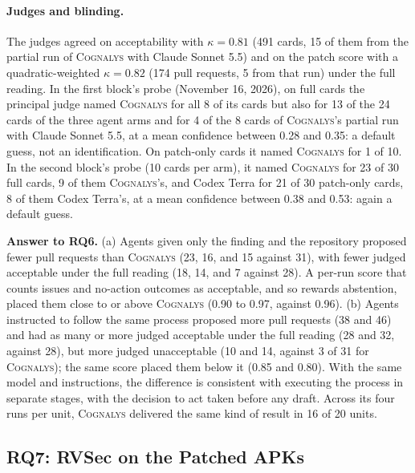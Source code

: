 \documentclass[conference]{IEEEtran}
\newcommand{\system}{\textsc{Cognalys}}
\newcommand{\researchq}[1]{\textbf{RQ#1}}
\begin{document}
\paragraph{Judges and blinding.} The judges agreed on acceptability with
$\kappa = 0.81$ (491 cards, 15 of them from the partial run of \system{} with
Claude Sonnet 5.5) and on the patch score with a quadratic-weighted
$\kappa = 0.82$ (174 pull requests, 5 from that run) under the full reading. In the first block's probe
(November 16, 2026), on full cards the principal judge named \system{} for all
8 of its cards but also for 13 of the 24 cards of the three agent arms and for
4 of the 8 cards of \system{}'s partial run with Claude Sonnet 5.5, at a mean
confidence between 0.28 and 0.35: a default guess, not an identification. On patch-only cards it named
\system{} for 1 of 10. In the second block's probe (10 cards per arm), it named \system{} for 23 of
30 full cards, 9 of them \system{}'s, and Codex Terra for 21 of 30 patch-only
cards, 8 of them Codex Terra's, at a mean confidence between 0.38 and 0.53:
again a default guess.

\textbf{Answer to \researchq{6}.} (a) Agents given only the finding and the
repository proposed fewer pull requests than \system{} (23, 16, and 15 against
31), with fewer judged acceptable under the full reading (18, 14, and 7 against
28). A per-run score that counts issues and no-action outcomes as acceptable,
and so rewards abstention, placed them close to or above \system{} (0.90 to
0.97, against 0.96). (b) Agents instructed to follow the same process proposed
more pull requests (38 and 46) and had as many or more judged acceptable under
the full reading (28 and 32, against 28), but more judged unacceptable (10 and
14, against 3 of 31 for \system{}); the same score placed them below it (0.85
and 0.80). With the same model and instructions, the difference is consistent
with executing the process in separate stages, with the decision to act taken
before any draft. Across its four runs per unit, \system{} delivered the same
kind of result in 16 of 20 units.

\subsection{\researchq{7}: RVSec on the Patched APKs}
\label{subsec:rq7}
\end{document}
